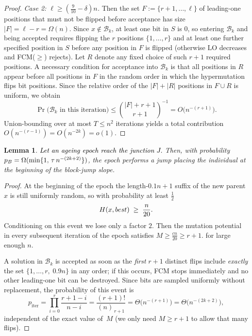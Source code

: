 \documentclass[lettersize,journal]{IEEEtran}
\newcommand{\new}[1]{\textcolor{black}{#1}}
\newcommand{\rerev}[1]{\textcolor{black}{#1}}
\newtheorem{lemma}{Lemma}
\begin{document}
{\begin{proof}
	\emph{Case 2: $\ell \ge (\tfrac{9}{10}-\delta)n$.}
	Then the set
	$F:=\{r{+}1,\dots,\ell\}$ of leading-one positions that must not be flipped before
	acceptance has size $|F|=\ell-r=\Omega(n)$.  Since $x\notin\mathcal{B}_k$, at
	least one bit in $S$ is $0$, so entering $\mathcal{B}_k$ and being accepted
	requires flipping the $r$ positions $\{1,\dots,r\}$ and at least one further
	specified position in $S$ before any position in $F$ is flipped (otherwise
	$\mathrm{LO}$ decreases and FCM($\ge$) rejects).  Let $R$ denote any fixed choice
	of such $r{+}1$ required positions.  A necessary condition for acceptance into
	$\mathcal{B}_k$ is that all positions in $R$ appear before all positions in $F$ in
	the random order in which the hypermutation flips bit positions.  Since the
	relative order of the $|F|+|R|$ positions in $F\cup R$ is uniform, we obtain
	\[
	\Pr\bigl(\mathcal{B}_k \text{ in this iteration}\bigr)
	\le
	\binom{|F|+r+1}{r+1}^{-1}
=
	O\!\bigl(n^{-(r+1)}\bigr).
	\]
	Union-bounding over at most $T\le n^2$ iterations yields a total contribution
	$O(n^{-(r-1)})=O(n^{-2k})=o(1)$.
	
\end{proof}


\setcounter{theorem}{12}
\begin{lemma} %
	\textcolor{black}{Let an ageing epoch reach the junction $J$.} Then, with probability $\new{p_B}=\Omega(\min\{1,\,\tau\,n^{-(2k+2)}\})$, the epoch performs a jump placing the individual at the beginning of the block-jump slope.
\end{lemma}


\begin{proof}
	At the beginning of the epoch the length-\(0.1n+1\) suffix of the new parent \(x\) is still uniformly random,
	so with probability at least \(\tfrac12\)
	\[
	\rerev{H}(x,best)\;\ge\;\frac{n}{20}.
	\]
	Conditioning on this event we lose only a factor \(2\).
	Then the mutation potential in every subsequent
	iteration of the epoch satisfies
	\(
	M\ge \tfrac{cn}{20}  \geq r+1.
	\) for large enough $n$.
	
A solution in $\mathcal{B}_k$ is accepted as soon as the \emph{first} $r{+}1$ distinct flips
	include \emph{exactly} the set
	\(\{1,\dots,r,\;0.9n\}\)
	in any order; if this occurs, FCM stops immediately and no other
	leading-one bit can be destroyed.
Since bits are sampled uniformly without replacement, the probability of
	this event is
	\[
	p_{\text{iter}}
	=\prod_{i=0}^{r}\frac{r+1-i}{n-i}
	=\frac{(r+1)!}{(n)_{\,r+1}}
	=\Theta\!\bigl(n^{-(r+1)}\bigr)
	=\Theta\!\bigl(n^{-(2k+2)}\bigr),
	\]
	independent of the exact value of~$M$ (we only need $M\ge r{+}1$ to allow that
	many flips).
	

\end{proof}}
\end{document}
